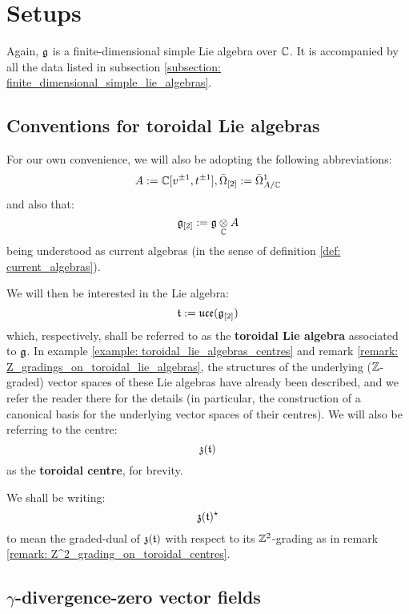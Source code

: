 \section{Setups}
    Again, $\mathfrak{g}$ is a finite-dimensional simple Lie algebra over $\mathbb{C}$. It is accompanied by all the data listed in subsection \ref{subsection: finite_dimensional_simple_lie_algebras}. 

    \subsection{Conventions for toroidal Lie algebras} \label{subsection: toroidal_lie_algebra_conventions}
        For our own convenience, we will also be adopting the following abbreviations:
            $$A := \mathbb{C}[v^{\pm 1}, t^{\pm 1}], \bar{\Omega}_{[2]} := \bar{\Omega}^1_{A/\mathbb{C}}$$
        and also that:
            $$\g_{[2]} := \g \tensor_{\bbC} A$$
        being understood as current algebras (in the sense of definition \ref{def: current_algebras}).
    
        We will then be interested in the Lie algebra:
            $$\mathfrak{t} := \mathfrak{uce}(\mathfrak{g}_{[2]})$$
        which, respectively, shall be referred to as the \textbf{toroidal Lie algebra} associated to $\mathfrak{g}$. In example \ref{example: toroidal_lie_algebras_centres} and remark \ref{remark: Z_gradings_on_toroidal_lie_algebras}, the structures of the underlying ($\mathbb{Z}$-graded) vector spaces of these Lie algebras have already been described, and we refer the reader there for the details (in particular, the construction of a canonical basis for the underlying vector spaces of their centres). We will also be referring to the centre:
            $$\mathfrak{z}(\mathfrak{t})$$
        as the \textbf{toroidal centre}, for brevity.

        We shall be writing:
            $$\mathfrak{z}(\mathfrak{t})^{\star}$$
        to mean the graded-dual of $\mathfrak{z}(\mathfrak{t})$ with respect to its $\mathbb{Z}^2$-grading as in remark \ref{remark: Z^2_grading_on_toroidal_centres}.
    
    \subsection{\texorpdfstring{$\gamma$}{}-divergence-zero vector fields} \label{subsection: yangian_div_zero_vector_fields}
    
